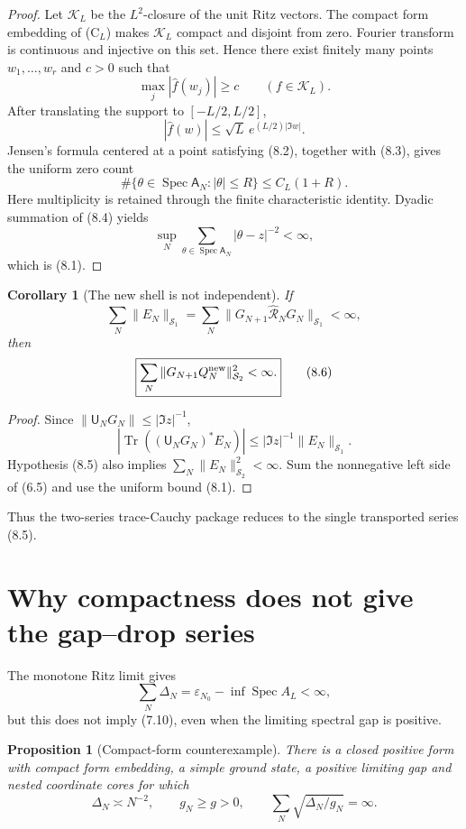 \documentclass[11pt]{amsart}
\newtheorem{proposition}[theorem]{Proposition}
\newtheorem{corollary}[theorem]{Corollary}
\theoremstyle{definition}
\theoremstyle{remark}
\newcommand{\Schatten}{\mathcal S}
\newcommand{\Spec}{\operatorname{Spec}}
\newcommand{\Tr}{\operatorname{Tr}}
\newcommand{\eps}{\varepsilon}
\begin{document}
\begin{proof}
Let \(\mathcal K_L\) be the \(L^2\)-closure of the unit Ritz vectors.  The
compact form embedding of \textup{(C\(_L\))} makes \(\mathcal K_L\) compact and disjoint from
zero.  Fourier transform is continuous and injective on this set.  Hence
there exist finitely many points \(w_1,\ldots,w_r\) and \(c>0\) such that
\[
 \max_j|\widehat f(w_j)|\ge c
 \qquad(f\in\mathcal K_L).
\tag{8.2}
\]
After translating the support to \([-L/2,L/2]\),
\[
 |\widehat f(w)|\le\sqrt L\,e^{(L/2)|\Im w|}.
\tag{8.3}
\]
Jensen's formula centered at a point satisfying (8.2), together with
(8.3), gives the uniform zero count
\[
 \#\{\theta\in\Spec\mathsf A_N:|\theta|\le R\}
 \le C_L(1+R).
\tag{8.4}
\]
Here multiplicity is retained through the finite characteristic identity.
Dyadic summation of (8.4) yields
\[
 \sup_N\sum_{\theta\in\Spec\mathsf A_N}|\theta-z|^{-2}<\infty,
\]
which is (8.1).
\end{proof}

\begin{corollary}[The new shell is not independent]
If
\[
 \sum_N\|E_N\|_{\Schatten_1}
 =\sum_N\|G_{N+1}\widehat{\mathcal R}_NG_N\|_{\Schatten_1}<\infty,
\tag{8.5}
\]
then
\[
\boxed{
 \sum_N\|G_{N+1}Q_N^{\rm new}\|_{\Schatten_2}^2<\infty.}
\tag{8.6}
\]
\end{corollary}

\begin{proof}
Since \(\|\mathsf U_NG_N\|\le|\Im z|^{-1}\),
\[
 |\Tr((\mathsf U_NG_N)^*E_N)|
 \le|\Im z|^{-1}\|E_N\|_{\Schatten_1}.
\]
Hypothesis (8.5) also implies
\(\sum_N\|E_N\|_{\Schatten_2}^2<\infty\).  Sum the nonnegative left side
of (6.5) and use the uniform bound (8.1).
\end{proof}

Thus the two-series trace-Cauchy package reduces to the single transported
series (8.5).

\section{Why compactness does not give the gap--drop series}
\label{sec:counterexample}

The monotone Ritz limit \cite[Prop.~3.4]{CCM} gives
\[
 \sum_N\Delta_N
 =\eps_{N_0}-\inf\Spec A_L<\infty,
\tag{9.1}
\]
but this does not imply (7.10), even when the limiting spectral gap is
positive.

\begin{proposition}[Compact-form counterexample]
There is a closed positive form with compact form embedding, a simple ground
state, a positive limiting gap and nested coordinate cores for which
\[
 \Delta_N\asymp N^{-2},\qquad g_N\ge g>0,\qquad
 \sum_N\sqrt{\Delta_N/g_N}=\infty.
\tag{9.2}
\]
\end{proposition}
\end{document}
